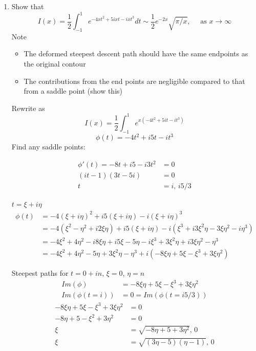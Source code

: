 \documentclass{X:/Documents/Coding/Latex/myassignment}
\begin{document}
\begin{enumerate}
\begin{enumerate}
	\end{enumerate}
	















	\clearpage
	\item Show that
	\[I(x) = \frac12 \int_{-1}^1 e^{-4xt^2 + 5ixt - ixt^3} dt \sim \frac12 e^{-2x} \sqrt{\pi/x} ,\quad \text{ as } x\to\infty\]
	Note
	\begin{itemize}
		\item The deformed steepest descent path should have the same endpoints as the original contour
		\item The contributions from the end points are negligible compared to that from a saddle point (show this)
	\end{itemize}
	Rewrite as
	\[I(x) = \frac12 \int_{-1}^{1} e^{x\left(-4t^2+5it-it^3\right)}\]
	\[\phi(t) = -4t^2 + i5t - it^3\]
	Find any saddle points:
 
	\begin{align*}
		\phi'(t) = -8t + i5 - i3t^2 &=0 \\
		(it-1)(3t-5i)&=0\\
		t &= i,\, i5/3
	\end{align*}

	$t=\xi+i\eta$
	\begin{align*}
		\phi(t) &= -4(\xi+i\eta)^2 + i5(\xi+i\eta) - i(\xi+i\eta)^3\\
		&=-4(\xi^2 -\eta^2 +i2\xi\eta) + i5(\xi+i\eta) - i(\xi^3 +i3\xi^2\eta - 3\xi\eta^2 -i\eta^3)\\
		&=-4\xi^2 +4\eta^2 -i8\xi\eta +i5\xi -5\eta - i\xi^3 +3\xi^2\eta + i3\xi\eta^2 -\eta^3\\
		&=-4\xi^2 + 4\eta^2 - 5\eta + 3\xi^2\eta -\eta^3 + i\left(-8\xi\eta + 5\xi - \xi^3 + 3\xi\eta^2\right)
	\end{align*}


	Steepest paths for $t=0+ in$, $\xi = 0$, $\eta = n$
	\begin{align*}
		Im(\phi) &= -8\xi\eta + 5\xi - \xi^3 + 3\xi\eta^2\\
		Im(\phi(t=i))&= 0 = Im(\phi(t=i5/3))
	\end{align*}
	\begin{align*}
		-8\xi\eta + 5\xi - \xi^3 + 3\xi\eta^2 &=0\\
		-8\eta + 5 - \xi^2 +3\eta^2 &= 0\\
		\xi &= \sqrt{-8\eta + 5  +3\eta^2},\, 0\\
		\xi &= \sqrt{(3\eta - 5)(\eta - 1)},\, 0
	\end{align*}


\end{enumerate}
\end{document}
